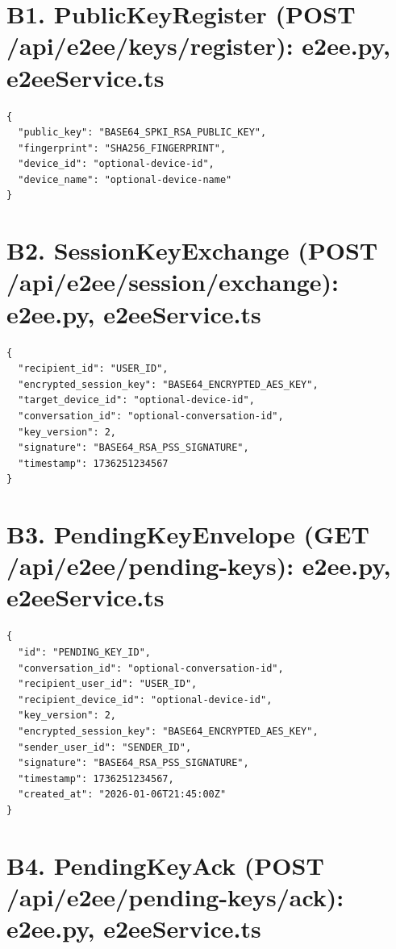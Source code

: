 \section*{B1. PublicKeyRegister (POST /api/e2ee/keys/register): e2ee.py, e2eeSer\-vice.ts}

\begin{verbatim}
{
  "public_key": "BASE64_SPKI_RSA_PUBLIC_KEY",
  "fingerprint": "SHA256_FINGERPRINT",
  "device_id": "optional-device-id",
  "device_name": "optional-device-name"
}
\end{verbatim}

\section*{B2. SessionKeyExchange (POST /api/e2ee/session/exchange): e2ee.py, e2eeSer\-vice.ts}

\begin{verbatim}
{
  "recipient_id": "USER_ID",
  "encrypted_session_key": "BASE64_ENCRYPTED_AES_KEY",
  "target_device_id": "optional-device-id",
  "conversation_id": "optional-conversation-id",
  "key_version": 2,
  "signature": "BASE64_RSA_PSS_SIGNATURE",
  "timestamp": 1736251234567
}
\end{verbatim}

\section*{B3. PendingKeyEnvelope (GET /api/e2ee/pending-keys): e2ee.py, e2eeSer\-vice.ts}

\begin{verbatim}
{
  "id": "PENDING_KEY_ID",
  "conversation_id": "optional-conversation-id",
  "recipient_user_id": "USER_ID",
  "recipient_device_id": "optional-device-id",
  "key_version": 2,
  "encrypted_session_key": "BASE64_ENCRYPTED_AES_KEY",
  "sender_user_id": "SENDER_ID",
  "signature": "BASE64_RSA_PSS_SIGNATURE",
  "timestamp": 1736251234567,
  "created_at": "2026-01-06T21:45:00Z"
}
\end{verbatim}

\section*{B4. PendingKeyAck (POST /api/e2ee/pending-keys/ack): e2ee.py, e2eeSer\-vice.ts}

